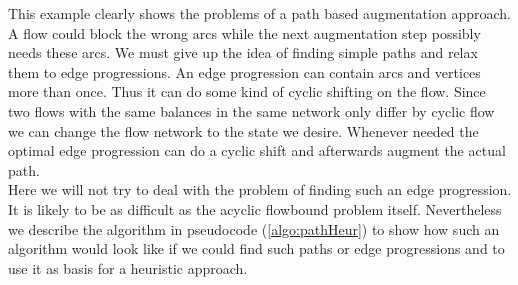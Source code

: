 This example clearly shows the problems of a path based augmentation approach. A flow could block the wrong arcs while 
the next augmentation step possibly needs these arcs. 
We must give up the idea of finding simple paths and relax them to edge progressions. An edge progression can 
contain arcs and vertices more than once. Thus it can do some kind of cyclic shifting on the flow. Since two flows with 
the same balances in the same network only differ by cyclic flow we can change the flow network to the state we desire. 
Whenever needed the optimal edge progression can do a cyclic shift and afterwards augment the actual path. \\

Here we will not try to deal with the problem of finding such an edge progression. It is likely to be as 
difficult as the acyclic flowbound problem itself. Nevertheless  we describe the algorithm 
in pseudocode (\ref{algo:pathHeur}) to show how such an algorithm would look like if we 
could find such paths or edge progressions and to use it as basis for a heuristic approach.

% 
% 
% 

